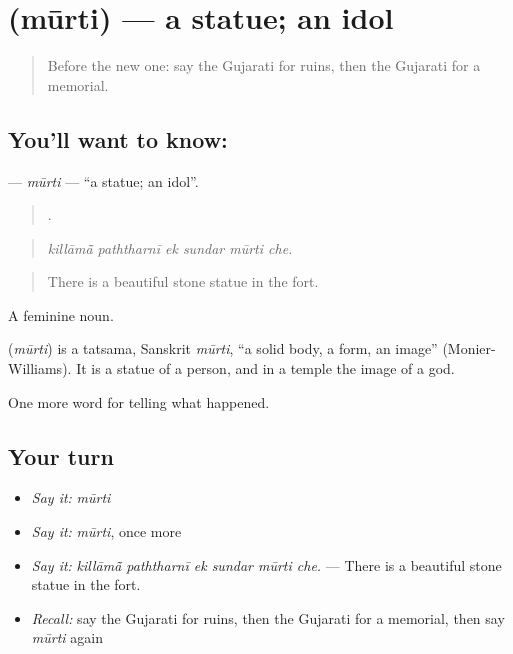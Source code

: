 \section[\texorpdfstring{\gu{મૂર્તિ} (mūrti)}{મૂર્તિ (mūrti)}]{ (mūrti) — a statue; an idol}

\label{lesson:GU-C319-murti}



\begin{quote}
Before the new one: say the Gujarati for ruins, then the Gujarati for a memorial.
\end{quote}

\subsection*{You'll want to know: }
\textbf{} — \emph{mūrti} — \textquotedblleft{}a statue; an idol\textquotedblright{}.

\begin{quote}
     .
\end{quote}

\begin{quote}
\emph{killāmā̃ paththarnī ek sundar mūrti che.}
\end{quote}

\begin{quote}
There is a beautiful stone statue in the fort.
\end{quote}

A feminine noun.

\begin{cousinweb}
\textbf{} (\emph{mūrti}) is a tatsama, Sanskrit \emph{mūrti}, \textquotedblleft{}a solid body, a form, an image\textquotedblright{} (Monier-Williams). It is a statue of a person, and in a temple the image of a god.
\end{cousinweb}

\begin{grammarlens}[title={What you've built}]
One more word for telling what happened.
\end{grammarlens}

\subsection*{Your turn}
\begin{itemize}
\raggedright
  \item \emph{Say it:} \emph{mūrti}
  \item \emph{Say it:} \emph{mūrti}, once more
  \item \emph{Say it:} \emph{killāmā̃ paththarnī ek sundar mūrti che.} — There is a beautiful stone statue in the fort.
  \item \emph{Recall:} say the Gujarati for ruins, then the Gujarati for a memorial, then say \emph{mūrti} again
\end{itemize}

